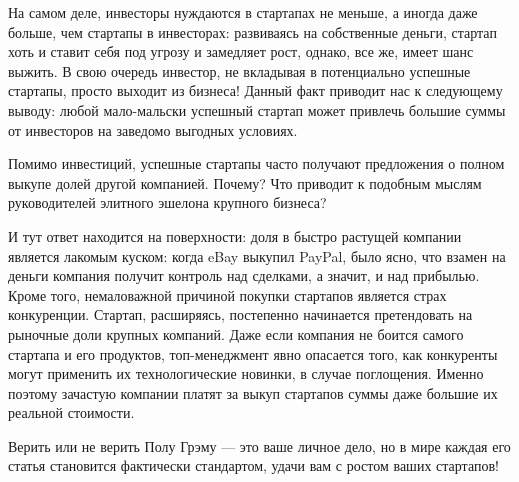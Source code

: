 \documentclass[ebook,12pt,oneside,openany]{memoir}
\begin{document}
На самом деле, инвесторы нуждаются в стартапах не меньше, а иногда
даже больше, чем стартапы в инвесторах: развиваясь на собственные
деньги, стартап хоть и ставит себя под угрозу и замедляет рост,
однако, все же, имеет шанс выжить. В свою очередь инвестор, не
вкладывая в потенциально успешные стартапы, просто выходит из бизнеса!
Данный факт приводит нас к следующему выводу: любой мало-мальски
успешный стартап может привлечь большие суммы от инвесторов на
заведомо выгодных условиях.

Помимо инвестиций, успешные стартапы часто получают предложения о
полном выкупе долей другой компанией. Почему? Что приводит к подобным
мыслям руководителей элитного эшелона крупного бизнеса?

И тут ответ находится на поверхности: доля в быстро растущей компании
является лакомым куском: когда eBay выкупил PayPal, было ясно, что
взамен на деньги компания получит контроль над сделками, а значит, и
над прибылью. Кроме того, немаловажной причиной покупки стартапов
является страх конкуренции. Стартап, расширяясь, постепенно начинается
претендовать на рыночные доли крупных компаний. Даже если компания не
боится самого стартапа и его продуктов, топ-менеджмент явно опасается
того, как конкуренты могут применить их технологические новинки, в
случае поглощения. Именно поэтому зачастую компании платят за выкуп
стартапов суммы даже большие их реальной стоимости.

Верить или не верить Полу Грэму — это ваше личное дело, но в мире
каждая его статья становится фактически стандартом, удачи вам с ростом
ваших стартапов!
\end{document}

